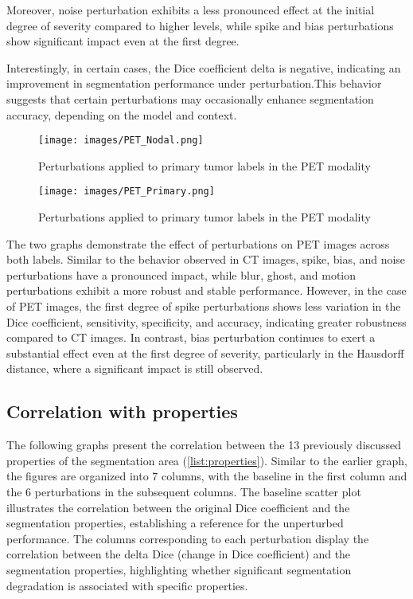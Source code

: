 Moreover, noise perturbation exhibits a less pronounced effect at the initial degree of severity compared to higher levels, 
while spike and bias perturbations show significant impact even at the first degree. 

Interestingly, in certain cases, the Dice coefficient delta is negative, indicating an improvement in segmentation 
performance under perturbation.This behavior suggests that certain perturbations may occasionally enhance segmentation accuracy, 
depending on the model and context.
\newpage
\begin{figure}[ht]
    \centering
    \texttt{[image: images/PET\_Nodal.png]}
    \caption{Perturbations applied to primary tumor labels in the PET modality}
    \label{fig:three_subfigures}
\end{figure}
\begin{figure}[ht]
    \centering
    \texttt{[image: images/PET\_Primary.png]}
    \caption{Perturbations applied to primary tumor labels in the PET modality}
    \label{fig:three_subfigures}
\end{figure}
The two graphs demonstrate the effect of perturbations on PET images across both labels. 
Similar to the behavior observed in CT images, spike, bias, and noise perturbations have a pronounced impact, 
while blur, ghost, and motion perturbations exhibit a more robust and stable performance. However, 
in the case of PET images, the first degree of spike perturbations shows less variation in the Dice coefficient, 
sensitivity, specificity, and accuracy, indicating greater robustness compared to CT images. In contrast, 
bias perturbation continues to exert a substantial effect even at the first degree of severity, particularly 
in the Hausdorff distance, where a significant impact is still observed.

\subsection{Correlation with properties}
The following graphs present the correlation between the 13 previously discussed properties of the segmentation area (\ref{list:properties}). Similar to the earlier graph, the figures are organized into 7 columns, with the baseline in the first column and the 6 perturbations in the subsequent columns. The baseline scatter plot illustrates the correlation between the original Dice coefficient and the segmentation properties, establishing a reference for the unperturbed performance. The columns corresponding to each perturbation display the correlation between the delta Dice (change in Dice coefficient) and the segmentation properties, highlighting whether significant segmentation degradation is associated with specific properties.

